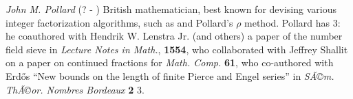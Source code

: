 \documentclass[12pt]{article}
\begin{document}
\emph{John M. Pollard} (? - ) British mathematician, best known for devising various integer factorization algorithms, such as  and Pollard's $\rho$ method. Pollard has  3: he coauthored with Hendrik W. Lenstra Jr. (and others) a paper of the number field sieve in {\it Lecture Notes in Math.}, {\bf 1554}, who collaborated with Jeffrey Shallit on a paper on continued fractions for {\it Math. Comp.} {\bf 61}, who co-authored with Erd\H{o}s ``New bounds on the length of finite Pierce and Engel series'' in {\it SÃ©m. ThÃ©or. Nombres Bordeaux} {\bf 2} 3.
\end{document}
